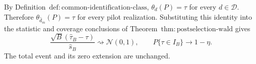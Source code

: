By Definition~\(\mathrm{def{:}common\text{-}identification\text{-}class}\), \(\theta_d(P)=\tau\) for every \(d\in\mathcal D\).  Therefore \(\theta_{\widehat d_m}(P)=\tau\) for every pilot realization.  Substituting this identity into the statistic and coverage conclusions of Theorem~\(\mathrm{thm{:}postselection\text{-}wald}\) gives
\[
 \frac{\sqrt B(\widehat\tau_B-\tau)}{\widehat s_B}
 \rightsquigarrow\mathcal N(0,1),
 \qquad P\{\tau\in I_B\}\to1-\eta.
\]
The total event and its zero extension are unchanged.